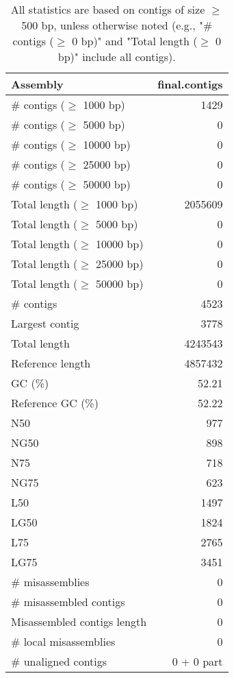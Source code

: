 \documentclass[12pt,a4paper]{article}
\begin{document}
\begin{table}[ht]
\begin{center}
\caption{All statistics are based on contigs of size $\geq$ 500 bp, unless otherwise noted (e.g., "\# contigs ($\geq$ 0 bp)" and "Total length ($\geq$ 0 bp)" include all contigs).}
\begin{tabular}{|l*{1}{|r}|}
\hline
Assembly & final.contigs \\ \hline
\# contigs ($\geq$ 1000 bp) & 1429 \\ \hline
\# contigs ($\geq$ 5000 bp) & 0 \\ \hline
\# contigs ($\geq$ 10000 bp) & 0 \\ \hline
\# contigs ($\geq$ 25000 bp) & 0 \\ \hline
\# contigs ($\geq$ 50000 bp) & 0 \\ \hline
Total length ($\geq$ 1000 bp) & 2055609 \\ \hline
Total length ($\geq$ 5000 bp) & 0 \\ \hline
Total length ($\geq$ 10000 bp) & 0 \\ \hline
Total length ($\geq$ 25000 bp) & 0 \\ \hline
Total length ($\geq$ 50000 bp) & 0 \\ \hline
\# contigs & 4523 \\ \hline
Largest contig & 3778 \\ \hline
Total length & 4243543 \\ \hline
Reference length & 4857432 \\ \hline
GC (\%) & 52.21 \\ \hline
Reference GC (\%) & 52.22 \\ \hline
N50 & 977 \\ \hline
NG50 & 898 \\ \hline
N75 & 718 \\ \hline
NG75 & 623 \\ \hline
L50 & 1497 \\ \hline
LG50 & 1824 \\ \hline
L75 & 2765 \\ \hline
LG75 & 3451 \\ \hline
\# misassemblies & 0 \\ \hline
\# misassembled contigs & 0 \\ \hline
Misassembled contigs length & 0 \\ \hline
\# local misassemblies & 0 \\ \hline
\# unaligned contigs & 0 + 0 part \\ \hline

\end{tabular}
\end{center}
\end{table}
\end{document}
